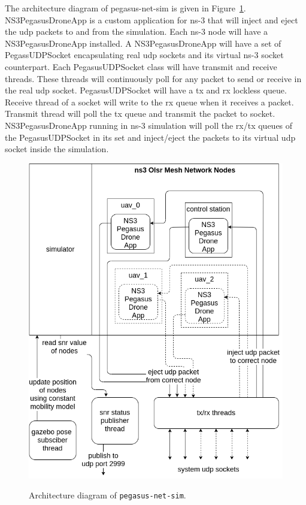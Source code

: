 The architecture diagram of pegasus-net-sim is given in Figure~\ref{fig:pegasus-net-sim}. NS3PegasusDroneApp is a custom application for ns-3 that will inject and eject the udp packets to and from the simulation. Each ns-3 node will have a NS3PegasusDroneApp installed. A NS3PegasusDroneApp will have a set of PegassUDPSocket encapsulating real udp sockets and its virtual ns-3 socket counterpart. Each PegasusUDPSocket class will have transmit and receive threads. These threads will continuously poll for any packet to send or receive in the real udp socket. PegasusUDPSocket will have a tx and rx lockless queue. Receive thread of a socket will write to the rx queue when it receives a packet. Transmit thread will poll the tx queue and transmit the packet to socket. NS3PegasusDroneApp running in ns-3 simulation will poll the rx/tx queues of the PegasusUDPSocket in its set and inject/eject the packets to its virtual udp socket inside the simulation.

\begin{figure}
	\centering
	\caption[Architecture of \texttt{pegasus-net-sim}]{\small Architecture diagram of \texttt{pegasus-net-sim}.}
	\includegraphics[width=5in]{figures/methodology/methodology-pegasus-net-sim}
	\label{fig:pegasus-net-sim}
\end{figure}

